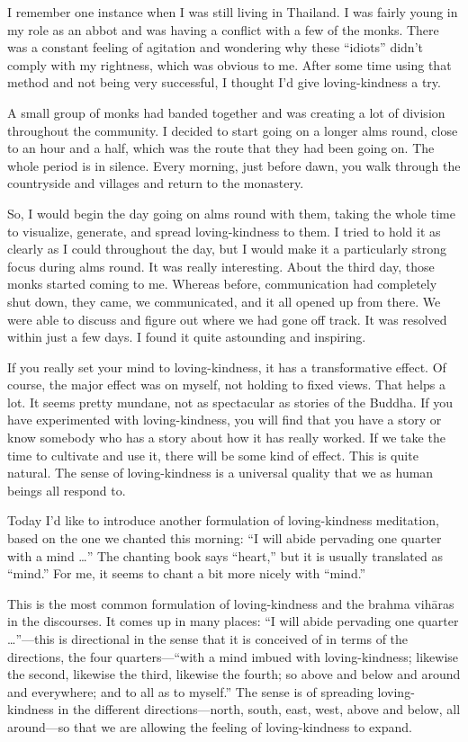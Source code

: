 I remember one instance when I was still living in Thailand. I was
fairly young in my role as an abbot and was having a conflict with a few
of the monks. There was a constant feeling of agitation and wondering
why these “idiots” didn’t comply with my rightness, which was obvious to
me. After some time using that method and not being very successful, I
thought I’d give loving-kindness a try.

A small group of monks had banded together and was creating a lot of
division throughout the community. I decided to start going on a longer
alms round, close to an hour and a half, which was the route that they
had been going on. The whole period is in silence. Every morning, just
before dawn, you walk through the countryside and villages and return to
the monastery.

So, I would begin the day going on alms round with them, taking the
whole time to visualize, generate, and spread loving-kindness to them. I
tried to hold it as clearly as I could throughout the day, but I would
make it a particularly strong focus during alms round. It was really
interesting. About the third day, those monks started coming to me.
Whereas before, communication had completely shut down, they came, we
communicated, and it all opened up from there. We were able to discuss
and figure out where we had gone off track. It was resolved within just
a few days. I found it quite astounding and inspiring.

If you really set your mind to loving-kindness, it has a transformative
effect. Of course, the major effect was on myself, not holding to fixed
views. That helps a lot. It seems pretty mundane, not as spectacular as
stories of the Buddha. If you have experimented with loving-kindness,
you will find that you have a story or know somebody who has a story
about how it has really worked. If we take the time to cultivate and use
it, there will be some kind of effect. This is quite natural. The sense
of loving-kindness is a universal quality that we as human beings all
respond to.

Today I’d like to introduce another formulation of loving-kindness
meditation, based on the one we chanted this morning: “I will abide
pervading one quarter with a mind \ldots{}” The chanting book says “heart,”
but it is usually translated as “mind.” For me, it seems to chant a bit
more nicely with “mind.”

This is the most common formulation of loving-kindness and the brahma
vihāras in the discourses. It comes up in many places: “I will abide
pervading one quarter \ldots{}”—this is directional in the sense that it is
conceived of in terms of the directions, the four quarters—“with a mind
imbued with loving-kindness; likewise the second, likewise the third,
likewise the fourth; so above and below and around and everywhere; and
to all as to myself.” The sense is of spreading loving-kindness in the
different directions—north, south, east, west, above and below, all
around—so that we are allowing the feeling of loving-kindness to expand.

